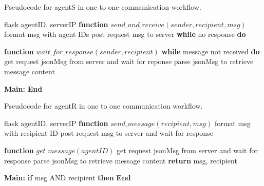 \begin{algorithm}
    \caption{Pseudocode for agentS in one to one communication workflow.}
    \label{alg: SRPseudoCode}
    \begin{algorithmic}[1]
     flask
     agentID, serverIP
        \State \textbf{function} {$send\_and\_receive(sender, recipient, msg)$}
        \State \qquad format msg with agent IDs 
        \State \qquad post request msg to server
        \State \textbf{\qquad while} no response \textbf{do}    
        \State \qquad {}

        \State \textbf{function} {$wait\_for\_response(sender, recipient)$}
        \State \textbf{\qquad while} message not received \textbf{do}    
        \State \qquad \qquad get request jsonMsg from server and wait for reponse
        \State \qquad \qquad parse jsonMsg to retrieve message content
    

    \State \textbf{Main:}
    \State {}
    \State \textbf{End} 
    \end{algorithmic}
\end{algorithm}


\begin{algorithm}
    \caption{Pseudocode for agentR in one to one communication workflow.}
    \label{alg: RSPseudoCode}
    \begin{algorithmic}[1]
     flask
     agentID, serverIP
        \State \textbf{function} {$send\_message(recipient, msg)$}
        \State \qquad format msg with recipient ID 
        \State \qquad post request msg to server and wait for response 

        \State \textbf{function} {$get\_message(agentID)$}  
        \State \qquad get request jsonMsg from server and wait for response
        \State \qquad parse jsonMsg to retrieve message content
        \State \qquad \textbf{return} msg, recipient         

    \State \textbf{Main:}
    \State {}
    \State \textbf{\qquad if} msg AND recipient \textbf{then}   
    \State \qquad {}
    \State \textbf{End} 
    \end{algorithmic}
    \end{algorithm}

